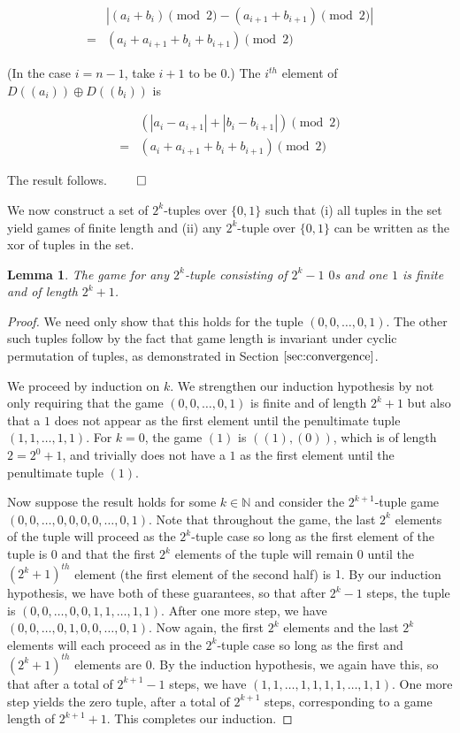 \documentclass[12pt]{amsart}
\newtheorem{lemma}[theorem]{Lemma}
\newcommand{\xor}{\oplus}
\newcommand{\diff}{D}
\newcommand{\znn}{\mathbb{N}}
\begin{document}
$$\begin{array}{cl}
& |(a_i+b_i)\pmod{2} - (a_{i+1}+b_{i+1})\pmod{2}| \\
= & (a_i+a_{i+1}+b_i+b_{i+1})\pmod{2}
\end{array}$$

(In the case $i=n-1$, take $i+1$ to be $0$.) The $i^{th}$ element of $\diff((a_i))\xor \diff((b_i))$ is

$$\begin{array}{cl}
& (|a_i-a_{i+1}|+|b_i-b_{i+1}|)\pmod{2} \\
= & (a_i+a_{i+1}+b_i+b_{i+1})\pmod{2}
\end{array}$$

The result follows. $\qed$

We now construct a set of $2^k$-tuples over $\{0,1\}$ such that (i) all tuples in the set yield games of finite length and (ii) any $2^k$-tuple over $\{0,1\}$ can be written as the xor of tuples in the set.

\begin{lemma}
The game for any $2^k$-tuple consisting of $2^k-1$ $0$s and one $1$ is finite and of length $2^k+1$.
\end{lemma}

\begin{proof}
We need only show that this holds for the tuple $(0,0,\ldots,0,1)$. The other such tuples follow by the fact that game length is invariant under cyclic permutation of tuples, as demonstrated in Section $\ref{sec:convergence}$.

We proceed by induction on $k$. We strengthen our induction hypothesis by not only requiring that the game $(0,0,\ldots,0,1)$ is finite and of length $2^k+1$ but also that a $1$ does not appear as the first element until the penultimate tuple $(1,1,\ldots,1,1)$. For $k=0$, the game $(1)$ is $((1),(0))$, which is of length $2=2^0+1$, and trivially does not have a $1$ as the first element until the penultimate tuple $(1)$.

Now suppose the result holds for some $k\in \znn$ and consider the $2^{k+1}$-tuple game $(0,0,\ldots,0,0,0,0,\ldots,0,1)$. Note that throughout the game, the last $2^k$ elements of the tuple will proceed as the $2^k$-tuple case so long as the first element of the tuple is $0$ and that the first $2^k$ elements of the tuple will remain $0$ until the $(2^k+1)^{th}$ element (the first element of the second half) is $1$. By our induction hypothesis, we have both of these guarantees, so that after $2^k-1$ steps, the tuple is $(0,0,\ldots,0,0,1,1,\ldots,1,1)$. After one more step, we have $(0,0,\ldots,0,1,0,0,\ldots,0,1)$. Now again, the first $2^k$ elements and the last $2^k$ elements will each proceed as in the $2^k$-tuple case so long as the first and $(2^k+1)^{th}$ elements are $0$. By the induction hypothesis, we again have this, so that after a total of $2^{k+1}-1$ steps, we have $(1,1,\ldots,1,1,1,1,\ldots,1,1)$. One more step yields the zero tuple, after a total of $2^{k+1}$ steps, corresponding to a game length of $2^{k+1}+1$. This completes our induction.
\end{proof}
\end{document}
